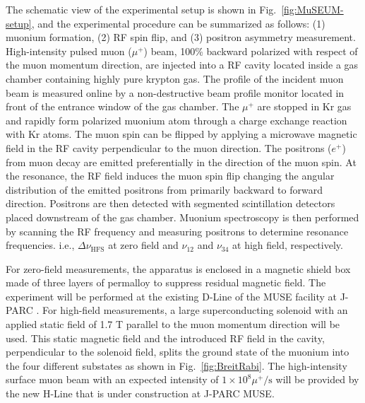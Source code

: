 The schematic view of the experimental setup is shown in
Fig.~\ref{fig:MuSEUM-setup}, and the experimental procedure
can be summarized as follows: (1) muonium formation, (2) RF
spin flip, and (3) positron asymmetry measurement.  High-intensity
pulsed muon ($\mu^+$) beam, 100\% backward polarized with
respect of the muon momentum direction, are injected into
a RF cavity located inside a gas chamber containing highly
pure krypton gas.  The profile of the incident muon beam
is measured online by a non-destructive beam profile monitor
located in front of the entrance window of the gas chamber.
The $\mu^+$ are stopped in Kr gas and rapidly form polarized
muonium atom through a charge exchange reaction with Kr atoms.
The muon spin can be flipped by applying a microwave magnetic
field in the RF cavity perpendicular to the muon direction.
The positrons ($e^+$) from muon decay are emitted preferentially
in the direction of the muon spin.  At the resonance, the
RF field induces the muon spin flip changing the angular
distribution of the emitted positrons from primarily backward
to forward direction.  Positrons are then detected with
segmented scintillation detectors placed downstream of the
gas chamber.  Muonium spectroscopy is then performed by
scanning the RF frequency and measuring positrons to determine
resonance frequencies. i.e., $\Delta \nu_{\text{HFS}}$
at zero field and $\nu_{12}$ and $\nu_{34}$ at high field,
respectively.


For zero-field measurements, the apparatus is enclosed in a
magnetic shield box made of three layers of permalloy to
suppress residual magnetic field.  The experiment will be
performed at the existing D-Line of the MUSE facility at
J-PARC \cite{Higemoto-etal}.  For high-field measurements,
a large superconducting solenoid with an applied static field
of 1.7 T parallel to the muon momentum direction will be used.
This static magnetic field and the introduced RF field in
the cavity, perpendicular to the solenoid field, splits the
ground state of the muonium into the four different substates
as shown in Fig.~\ref{fig:BreitRabi}.  The high-intensity
surface muon beam with an expected intensity of 
$1\times 10^{8} \mu^+/{\text{s}}$ will be provided by the new
H-Line that is under construction at J-PARC MUSE.

